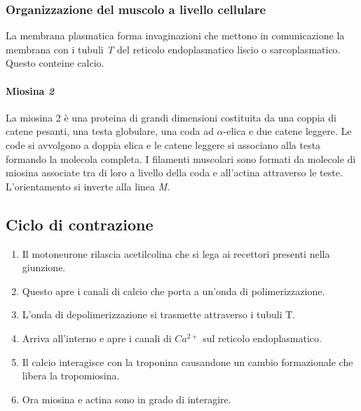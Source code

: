 		\subsubsection{Organizzazione del muscolo a livello cellulare}
		La membrana plasmatica forma invaginazioni che mettono in comunicazione la membrana con i tubuli \emph{T} del reticolo endoplasmatico liscio o sarcoplasmatico.
		Questo conteine calcio.

			\paragraph{Miosina \emph{2}}
			La miosina 2 \`e una proteina di grandi dimensioni costituita da una coppia di catene pesanti, una testa globulare, una coda ad $\alpha$-elica e due catene leggere.
			Le code si avvolgono a doppia elica e le catene leggere si associano alla testa formando la molecola completa.
			I filamenti muscolari sono formati da molecole di miosina associate tra di loro a livello della coda e all'actina attraverso le teste.
			L'orientamento si inverte alla linea \emph{M}.

	\subsection{Ciclo di contrazione}
	\begin{multicols}{2}
		\begin{enumerate}
			\item Il motoneurone rilascia acetilcolina che si lega ai recettori presenti nella giunzione.
			\item Questo apre i canali di calcio che porta a un'onda di polimerizzazione.
			\item L'onda di depolimerizzazione si trasmette attraverso i tubuli T.
			\item Arriva all'interno e apre i canali di \emph{$Ca^{2+}$} sul reticolo endoplasmatico.
			\item Il calcio interagisce con la troponina causandone un cambio formazionale che libera la tropomiosina.
			\item Ora miosina e actina sono in grado di interagire.
		\end{enumerate}
	\end{multicols}

